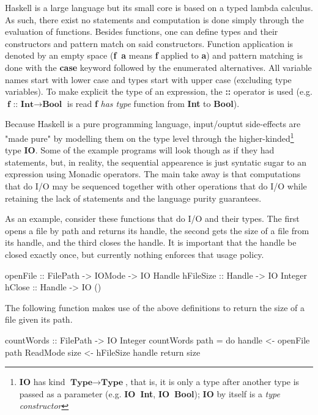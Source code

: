 \documentclass[]{lwnovathesis}
\begin{document}
Haskell is a large language but its small core is based on a typed lambda
calculus. As such, there exist no statements and computation is done simply
through the evaluation of functions. Besides functions, one can define types and
their constructors and pattern match on said constructors. Function application
is denoted by an empty space (\textbf{f~a} means \textbf{f} applied to
\textbf{a}) and pattern matching is done with the \textbf{case} keyword followed
by the enumerated alternatives. All variable names start with lower case and
types start with upper case (excluding type variables). To make explicit the
type of an expression, the \textbf{::} operator is used (e.g.
$\textbf{f~::~Int}\to \textbf{Bool}$ is read \textbf{f} \emph{has type} function
from \textbf{Int} to \textbf{Bool}).

Because Haskell is a pure programming language, input/ouptut side-effects are
"made pure" by modelling them on the type level through the
higher-kinded\footnote{\textbf{IO} has kind $\textbf{Type}\to\textbf{Type}$,
that is, it is only a type after another type is passed as a parameter (e.g.
\textbf{IO~Int}, \textbf{IO~Bool}); \textbf{IO} by itself is a \emph{type
constructor}} type \textbf{IO}. Some of the example programs will look though as
if they had statements, but, in reality, the sequential appearence is just
syntatic sugar to an expression using Monadic operators. The main take away is
that computations that do I/O may be sequenced together with other operations
that do I/O while retaining the lack of statements and the language purity
guarantees.


As an example, consider these functions that do I/O and their types. The first
opens a file by path and returns its handle, the second gets the size of a file
from its handle, and the third closes the handle. It is important that the
handle be closed exactly once, but currently nothing enforces that usage policy.

\begin{code}
openFile :: FilePath -> IOMode -> IO Handle
hFileSize :: Handle -> IO Integer
hClose   :: Handle -> IO ()
\end{code}

The following function makes use of the above definitions to return the size of
a file given its path.
\begin{code}
countWords :: FilePath -> IO Integer
countWords path = do
    handle <- openFile path ReadMode
    size   <- hFileSize handle
    return size
\end{code}
\end{document}

